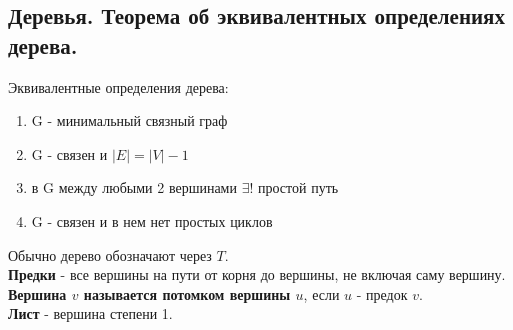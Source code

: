 \subsection{Деревья. Теорема об эквивалентных определениях дерева.}

Эквивалентные определения дерева:

\begin{enumerate}
    \item G - минимальный связный граф
    \item G - связен и $|E| = |V| - 1$
    \item в G между любыми 2 вершинами $\exists!$ простой путь
    \item G - связен и в нем нет простых циклов
\end{enumerate}

Обычно дерево обозначают через $T$.\\

\textbf{Предки} - все вершины на пути от корня до вершины, не включая саму вершину.\\

\textbf{Вершина $v$ называется потомком вершины $u$}, если $u$ - предок $v$.\\

\textbf{Лист} - вершина степени 1.